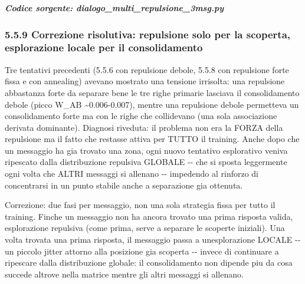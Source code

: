 \documentclass[
  italian,
]{article}
\begin{document}
\textit{\textbf{Codice sorgente: dialogo\_\allowbreak{}multi\_\allowbreak{}repulsione\_\allowbreak{}3msg.py}}


\subsubsection{5.5.9 Correzione risolutiva: repulsione solo per la scoperta, esplorazione locale per il consolidamento}\label{correzione-risolutiva-repulsione-solo-per-la-scoperta-esplorazione-locale-per-il-consolidamento}

Tre tentativi precedenti (5.5.6 con repulsione debole, 5.5.8 con repulsione forte fissa e con annealing) avevano mostrato una tensione irrisolta: una repulsione abbastanza forte da separare bene le tre righe primarie lasciava il consolidamento debole (picco W\_\allowbreak{}AB \textasciitilde0.006-0.007), mentre una repulsione debole permetteva un consolidamento forte ma con le righe che collidevano (una sola associazione derivata dominante). Diagnosi riveduta: il problema non era la FORZA della repulsione ma il fatto che restasse attiva per TUTTO il training. Anche dopo che un messaggio ha gia\textquotesingle{} trovato una zona, ogni nuovo tentativo esplorativo veniva ripescato dalla distribuzione repulsiva GLOBALE -\/- che si sposta leggermente ogni volta che ALTRI messaggi si allenano -\/- impedendo al rinforzo di concentrarsi in un punto stabile anche a separazione gia\textquotesingle{} ottenuta.

Correzione: due fasi per messaggio, non una sola strategia fissa per tutto il training. Finche\textquotesingle{} un messaggio non ha ancora trovato una prima risposta valida, esplorazione repulsiva (come prima, serve a separare le scoperte iniziali). Una volta trovata una prima risposta, il messaggio passa a un\textquotesingle esplorazione LOCALE -\/- un piccolo jitter attorno alla posizione gia\textquotesingle{} scoperta -\/- invece di continuare a ripescare dalla distribuzione globale: il consolidamento non dipende piu\textquotesingle{} da cosa succede altrove nella matrice mentre gli altri messaggi si allenano.
\end{document}
